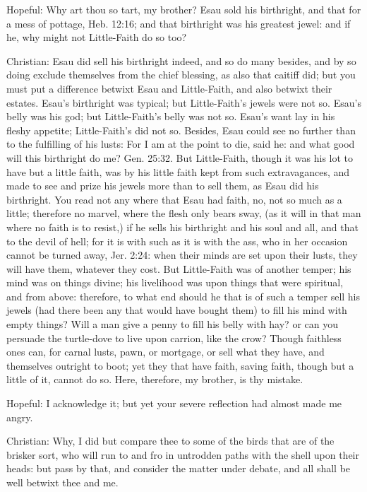 Hopeful: Why art thou so tart, my brother? Esau sold his birthright, and that for a mess of pottage, Heb. 12:16; and that birthright was his greatest jewel: and if he, why might not Little-Faith do so too?

Christian: Esau did sell his birthright indeed, and so do many besides, and by so doing exclude themselves from the chief blessing, as also that caitiff did; but you must put a difference betwixt Esau and Little-Faith, and also betwixt their estates. Esau's birthright was typical; but Little-Faith's jewels were not so. Esau's belly was his god; but Little-Faith's belly was not so. Esau's want lay in his fleshy appetite; Little-Faith's did not so. Besides, Esau could see no further than to the fulfilling of his lusts: For I am at the point to die, said he: and what good will this birthright do me? Gen. 25:32. But Little-Faith, though it was his lot to have but a little faith, was by his little faith kept from such extravagances, and made to see and prize his jewels more than to sell them, as Esau did his birthright. You read not any where that Esau had faith, no, not so much as a little; therefore no marvel, where the flesh only bears sway, (as it will in that man where no faith is to resist,) if he sells his birthright and his soul and all, and that to the devil of hell; for it is with such as it is with the ass, who in her occasion cannot be turned away, Jer. 2:24: when their minds are set upon their lusts, they will have them, whatever they cost. But Little-Faith was of another temper; his mind was on things divine; his livelihood was upon things that were spiritual, and from above: therefore, to what end should he that is of such a temper sell his jewels (had there been any that would have bought them) to fill his mind with empty things? Will a man give a penny to fill his belly with hay? or can you persuade the turtle-dove to live upon carrion, like the crow? Though faithless ones can, for carnal lusts, pawn, or mortgage, or sell what they have, and themselves outright to boot; yet they that have faith, saving faith, though but a little of it, cannot do so. Here, therefore, my brother, is thy mistake.

Hopeful: I acknowledge it; but yet your severe reflection had almost made me angry.

Christian: Why, I did but compare thee to some of the birds that are of the brisker sort, who will run to and fro in untrodden paths with the shell upon their heads: but pass by that, and consider the matter under debate, and all shall be well betwixt thee and me.

